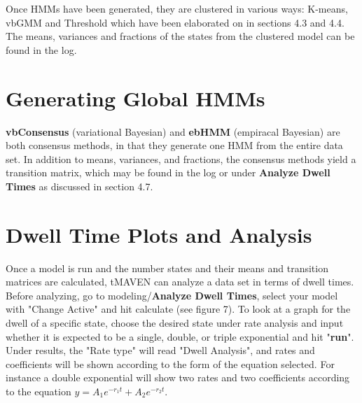 \documentclass[11pt,a5paper,footinclude=true,headinclude=true]{scrbook} %
\begin{document}
Once HMMs have been generated, they are clustered in various ways: K-means, vbGMM and Threshold which have been elaborated on in sections 4.3 and 4.4. The means, variances and fractions of the states from the clustered model can be found in the log.

\section{Generating Global HMMs}

\textbf{vbConsensus} (variational Bayesian) \cite{TMAVENPAPER} and \textbf{ebHMM} (empiracal Bayesian) \cite{van_de_Meent} are both consensus methods, in that they generate one HMM from the entire data set. In addition to means, variances, and fractions, the consensus methods yield a transition matrix, which may be found in the log or under \textbf{Analyze Dwell Times} as discussed in section 4.7.


\section{Dwell Time Plots and Analysis}
Once a model is run and the number states and their means and transition matrices are calculated, tMAVEN can analyze a data set in terms of dwell times. Before analyzing, go to modeling/\textbf{Analyze Dwell Times}, select your model with "Change Active" and hit calculate (see figure 7). 
To look at a graph for the dwell of a specific state, choose the desired state under rate analysis and input whether it is expected to be a single, double, or triple exponential and hit "\textbf{run}". Under results, the "Rate type" will read "Dwell Analysis", and rates and coefficients will be shown according to the form of the equation selected. For instance a double exponential will show two rates and two coefficients according to the equation $y=A_1e^{-r_1t}+A_2e^{-r_2t}$. 
\end{document}
